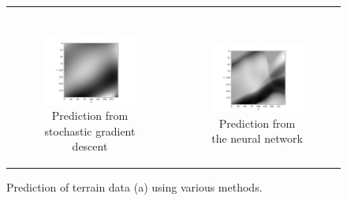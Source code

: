 \begin{figure}[t]
\begin{tabular}{cc}
\begin{subfigure}[b]{0.49\textwidth}
        \end{subfigure} \\
        \begin{subfigure}[b]{0.49\textwidth}
            \centering
            \includegraphics[width=\textwidth]{examples/tests_even/figs/gradient-descent-terrain-map.pdf}
            \caption{Prediction from stochastic gradient descent}
            \label{fig:terrain1-gd}
        \end{subfigure} &
        \begin{subfigure}[b]{0.49\textwidth}
            \centering
            \includegraphics[width=\textwidth]{examples/tests_even/figs/neural-network-terrain-map.pdf}
            \caption{Prediction from the neural network}
            \label{fig:terrain1-nn}
        \end{subfigure}
    \end{tabular}
    \caption{Prediction of terrain data (a) using various methods.}
    \label{fig:terrain-allfigs}
\end{figure}
\clearpage

